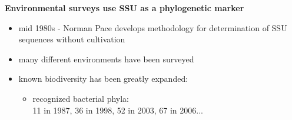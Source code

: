 \documentclass[landscape]{slides}
\begin{document}
\begin{slide}
\begin{center}

\textbf{Environmental surveys use SSU as a phylogenetic marker}
\end{center}
\medskip
\begin{minipage}{7in}
\small
\begin{itemize}
\item
mid 1980s - Norman Pace develops methodology for determination of SSU
sequences without cultivation
\item
many different environments have been surveyed

\item
known biodiversity has been greatly expanded:

\begin{itemize}
      \item
	recognized bacterial phyla: \\
	11 in 1987, 36 in 1998, 52 in 2003, 67 in 2006...
    \end{itemize}
\end{itemize}
\vspace{0.3in}


\end{minipage}
\end{slide}
\end{document}
